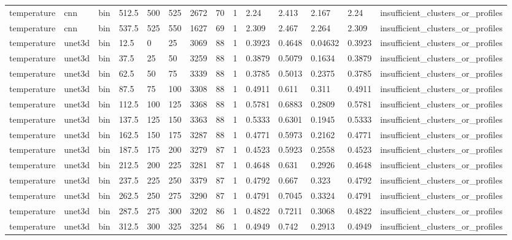 \begin{table}[htbp]
\begin{tabular}{llllllllllllll}
temperature & cnn & bin & 512.5 & 500 & 525 & 2672 & 70 & 1 & 2.24 & 2.413 & 2.167 & 2.24 & insufficient\_clusters\_or\_profiles \\
temperature & cnn & bin & 537.5 & 525 & 550 & 1627 & 69 & 1 & 2.309 & 2.467 & 2.264 & 2.309 & insufficient\_clusters\_or\_profiles \\
temperature & unet3d & bin & 12.5 & 0 & 25 & 3069 & 88 & 1 & 0.3923 & 0.4648 & 0.04632 & 0.3923 & insufficient\_clusters\_or\_profiles \\
temperature & unet3d & bin & 37.5 & 25 & 50 & 3259 & 88 & 1 & 0.3879 & 0.5079 & 0.1634 & 0.3879 & insufficient\_clusters\_or\_profiles \\
temperature & unet3d & bin & 62.5 & 50 & 75 & 3339 & 88 & 1 & 0.3785 & 0.5013 & 0.2375 & 0.3785 & insufficient\_clusters\_or\_profiles \\
temperature & unet3d & bin & 87.5 & 75 & 100 & 3308 & 88 & 1 & 0.4911 & 0.611 & 0.311 & 0.4911 & insufficient\_clusters\_or\_profiles \\
temperature & unet3d & bin & 112.5 & 100 & 125 & 3368 & 88 & 1 & 0.5781 & 0.6883 & 0.2809 & 0.5781 & insufficient\_clusters\_or\_profiles \\
temperature & unet3d & bin & 137.5 & 125 & 150 & 3363 & 88 & 1 & 0.5333 & 0.6301 & 0.1945 & 0.5333 & insufficient\_clusters\_or\_profiles \\
temperature & unet3d & bin & 162.5 & 150 & 175 & 3287 & 88 & 1 & 0.4771 & 0.5973 & 0.2162 & 0.4771 & insufficient\_clusters\_or\_profiles \\
temperature & unet3d & bin & 187.5 & 175 & 200 & 3279 & 87 & 1 & 0.4523 & 0.5923 & 0.2558 & 0.4523 & insufficient\_clusters\_or\_profiles \\
temperature & unet3d & bin & 212.5 & 200 & 225 & 3281 & 87 & 1 & 0.4648 & 0.631 & 0.2926 & 0.4648 & insufficient\_clusters\_or\_profiles \\
temperature & unet3d & bin & 237.5 & 225 & 250 & 3379 & 87 & 1 & 0.4792 & 0.667 & 0.323 & 0.4792 & insufficient\_clusters\_or\_profiles \\
temperature & unet3d & bin & 262.5 & 250 & 275 & 3290 & 87 & 1 & 0.4791 & 0.7045 & 0.3324 & 0.4791 & insufficient\_clusters\_or\_profiles \\
temperature & unet3d & bin & 287.5 & 275 & 300 & 3202 & 86 & 1 & 0.4822 & 0.7211 & 0.3068 & 0.4822 & insufficient\_clusters\_or\_profiles \\
temperature & unet3d & bin & 312.5 & 300 & 325 & 3254 & 86 & 1 & 0.4949 & 0.742 & 0.2913 & 0.4949 & insufficient\_clusters\_or\_profiles \\

\end{tabular}
\end{table}
